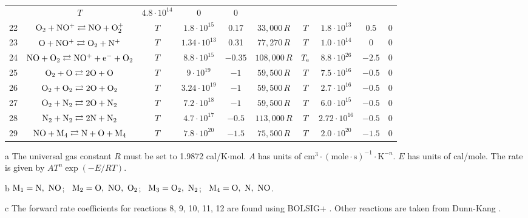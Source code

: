 \documentclass{warpdoc}
\begin{document}
\begin{table}[t]
\begin{center}
\begin{threeparttable}
\begin{tabular}{cccccccccc}
                                          &$T$ & $4.8 \cdot 10^{14}$  & $0$  & 0\\
22 & $\rm O_2 + NO^+ \rightleftarrows NO + O_2^{+}$ &$T$ & $1.8 \cdot 10^{15}$ & 0.17 & $33,000\, R$ 
                                          &$T$ & $1.8 \cdot 10^{13}$  & $0.5$  & 0\\
23 & $\rm O + NO^+ \rightleftarrows O_2 + N^+$ &$T$ & $1.34 \cdot 10^{13}$ & 0.31 & $77,270\, R$ 
                                          &$T$ & $1.0 \cdot 10^{14}$  & $0$  & 0\\
24 & $\rm NO + O_2 \rightleftarrows NO^+ + e^- + O_2$ &$T$ & $8.8 \cdot 10^{15}$ & $-0.35$ & $108,000\, R$ 
                                          &$T_{\rm e}$ & $8.8 \cdot 10^{26}$  & $-2.5$  & 0\\
25 & $\rm O_2 + O \rightleftarrows 2O + O$ &$T$ & $9 \cdot 10^{19}$ & $-1$ & $59,500\, R$ 
                                          &$T$ & $7.5 \cdot 10^{16}$  & $-0.5$  & 0\\
26 & $\rm O_2 + O_2 \rightleftarrows 2O + O_2$ &$T$ & $3.24 \cdot 10^{19}$ & $-1$ & $59,500\, R$ 
                                          &$T$ & $2.7 \cdot 10^{16}$  & $-0.5$  & 0\\
27 & $\rm O_2 + N_2 \rightleftarrows 2O + N_2$ &$T$ & $7.2 \cdot 10^{18}$ & $-1$ & $59,500\, R$ 
                                          &$T$ & $6.0 \cdot 10^{15}$  & $-0.5$  & 0\\
28 & $\rm N_2 + N_2 \rightleftarrows 2N + N_2$ &$T$ & $4.7 \cdot 10^{17}$ & $-0.5$ & $113,000\, R$ 
                                          &$T$ & $2.72 \cdot 10^{16}$  & $-0.5$  & 0\\
29 & $\rm NO + M_4 \rightleftarrows N + O + M_4$ &$T$ & $7.8 \cdot 10^{20}$ & $-1.5$ & $75,500\, R$ 
                                          &$T$ & $2.0 \cdot 10^{20}$  & $-1.5$  & 0\\
\bottomrule
\end{tabular}
\begin{tablenotes}
\item[{a}] The universal gas constant $R$ must be set to 1.9872	cal/K$\cdot$mol. $A$ has units of $\textrm{cm}^3\cdot(\textrm{mole}\cdot \textrm{s})^{-1}\cdot \textrm{K}^{-n}$. $E$ has units of cal/mole. The rate is given by $A T^n \exp(-E/RT).$
\item[{b}] $\rm M_1=N,~NO$;~ $\rm M_2=O,~NO,~O_2$;~ $\rm M_3=O_2,~N_2$;~ $\rm M_4=O,~N,~NO$.
\item[{c}] The forward rate coefficients for reactions 8, 9, 10, 11, 12 are found using BOLSIG+ \cite{psst:2005:hagelaar,pcpp:1992:morgan}. Other reactions are taken from Dunn-Kang \cite{nasa:1973:dunn}.
\end{tablenotes}
\label{tab:parent}
\end{threeparttable}
\end{center}
\end{table}
%
\end{document}
